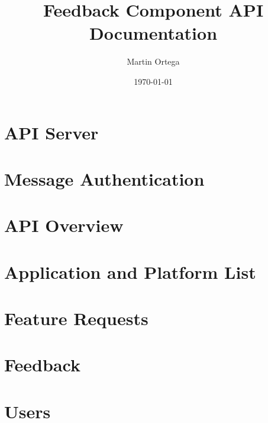 \documentclass{report}
\begin{document}
	\title{Feedback Component API Documentation}
	\author{Martin Ortega}
	\date{\today}
	\maketitle

	\tableofcontents

	\chapter{API Server}
		

	\chapter{Message Authentication}
		

	\chapter{API Overview}
		

	\chapter{Application and Platform List}
		

	\chapter{Feature Requests}
		

	\chapter{Feedback}
		

	\chapter{Users}
		
\end{document}
